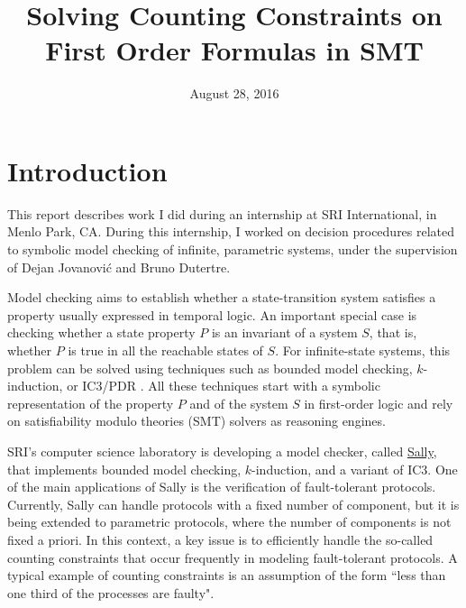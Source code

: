 \documentclass[]{article}
\title{Solving Counting Constraints on First Order Formulas in SMT}
\date{August 28, 2016}
\begin{document}
\maketitle

{
\setcounter{tocdepth}{3}
\tableofcontents
}

\newtheorem{definition}{Definition} \newtheorem{lemma}{Lemma}
\newtheorem{theorem}{Theorem} \newtheorem{property}{Property}
\newtheorem{example}{Example}

\newpage

\section*{Introduction}\label{introduction}


This report describes work I did during an internship at SRI
International, in Menlo Park, CA. During this internship, I
worked on decision procedures related to symbolic model checking
of infinite, parametric systems, under the supervision of
Dejan Jovanović and Bruno Dutertre.

Model checking aims to establish whether a state-transition
system satisfies a property usually expressed in temporal logic.
An important special case is checking whether a state property
$P$ is an invariant of a system $S$, that is, whether $P$ is true in
all the reachable states of $S$. For infinite-state systems, this
problem can be solved using techniques such as bounded model
checking, $k$-induction, or IC3/PDR \cite{pdr}. All these techniques start with
a symbolic representation of the property $P$ and of the system $S$ in
first-order logic and rely on satisfiability modulo theories (SMT)
solvers as reasoning engines.

SRI's computer science laboratory is developing a model checker,
called \href{http://sri-csl.github.io/sally/}{Sally}, that implements bounded model checking, $k$-induction,
and a variant of IC3.  One of the main applications of Sally is the
verification of fault-tolerant protocols. Currently, Sally can
handle protocols with a fixed number of component, but it is being
extended to parametric protocols, where the number of components is
not fixed a priori. In this context, a key issue is to efficiently
handle the so-called counting constraints that occur frequently in
modeling fault-tolerant protocols. A typical example of counting
constraints is an assumption of the form ``less than one third of
the processes are faulty".
\end{document}
